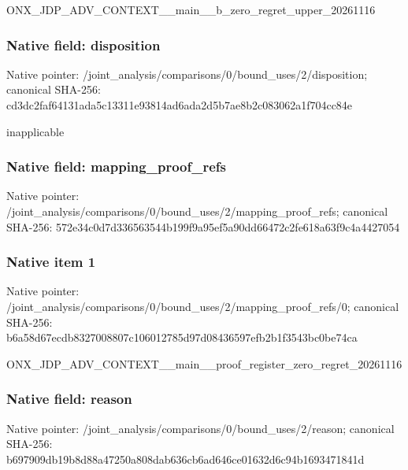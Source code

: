 \documentclass[10pt,a4paper]{article}
\begin{document}
\begingroup\raggedright\sloppy ONX\_\allowbreak{}JDP\_\allowbreak{}ADV\_\allowbreak{}CONTEXT\_\allowbreak{}\_\allowbreak{}main\_\allowbreak{}\_\allowbreak{}b\_\allowbreak{}zero\_\allowbreak{}regret\_\allowbreak{}upper\_\allowbreak{}20261116\par\endgroup

\subsubsection{Native field: disposition}
Native pointer: /joint\_\allowbreak{}analysis/comparisons/0/bound\_\allowbreak{}uses/2/disposition; canonical SHA-256: cd3dc2faf64131ada5c13311e93814ad6ada2d5b7ae8b2c083062a1f704cc84e

\begingroup\raggedright\sloppy inapplicable\par\endgroup

\subsubsection{Native field: mapping\_\allowbreak{}proof\_\allowbreak{}refs}
Native pointer: /joint\_\allowbreak{}analysis/comparisons/0/bound\_\allowbreak{}uses/2/mapping\_\allowbreak{}proof\_\allowbreak{}refs; canonical SHA-256: 572e34c0d7d336563544b199f9a95ef5a90dd66472c2fe618a63f9c4a4427054

\subsubsection{Native item 1}
Native pointer: /joint\_\allowbreak{}analysis/comparisons/0/bound\_\allowbreak{}uses/2/mapping\_\allowbreak{}proof\_\allowbreak{}refs/0; canonical SHA-256: b6a58d67ecdb8327008807c106012785d97d08436597efb2b1f3543bc0be74ca

\begingroup\raggedright\sloppy ONX\_\allowbreak{}JDP\_\allowbreak{}ADV\_\allowbreak{}CONTEXT\_\allowbreak{}\_\allowbreak{}main\_\allowbreak{}\_\allowbreak{}proof\_\allowbreak{}register\_\allowbreak{}zero\_\allowbreak{}regret\_\allowbreak{}20261116\par\endgroup

\subsubsection{Native field: reason}
Native pointer: /joint\_\allowbreak{}analysis/comparisons/0/bound\_\allowbreak{}uses/2/reason; canonical SHA-256: b697909db19b8d88a47250a808dab636cb6ad646ce01632d6c94b1693471841d
\end{document}
